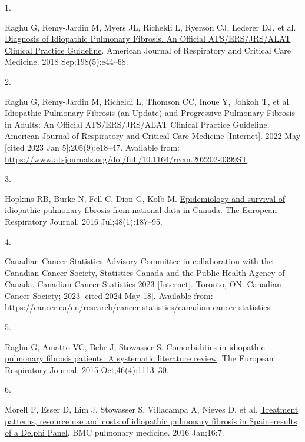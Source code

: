 \documentclass[
]{article}
\newlength{\cslhangindent}
\newlength{\csllabelwidth}
\newenvironment{CSLReferences}[2] %
 {\begin{list}{}{%
  \setlength{\itemindent}{0pt}
  \setlength{\leftmargin}{0pt}
  \setlength{\parsep}{0pt}
  \ifodd #1
   \setlength{\leftmargin}{\cslhangindent}
   \setlength{\itemindent}{-1\cslhangindent}
  \fi
  \setlength{\itemsep}{#2\baselineskip}}}
 {\end{list}}
\newcommand{\CSLLeftMargin}[1]{\parbox[t]{\csllabelwidth}{\strut#1\strut}}
\newcommand{\CSLRightInline}[1]{\parbox[t]{\linewidth - \csllabelwidth}{\strut#1\strut}}
\begin{document}
\label{refs}
\begin{CSLReferences}{0}{1}
\CSLLeftMargin{1. }%
\CSLRightInline{Raghu G, Remy-Jardin M, Myers JL, Richeldi L, Ryerson CJ, Lederer DJ, et al. \href{https://doi.org/10.1164/rccm.201807-1255ST}{Diagnosis of {Idiopathic} {Pulmonary} {Fibrosis}. {An} {Official} {ATS}/{ERS}/{JRS}/{ALAT} {Clinical} {Practice} {Guideline}}. American Journal of Respiratory and Critical Care Medicine. 2018 Sep;198(5):e44--68. }

\CSLLeftMargin{2. }%
\CSLRightInline{Raghu G, Remy-Jardin M, Richeldi L, Thomson CC, Inoue Y, Johkoh T, et al. Idiopathic {Pulmonary} {Fibrosis} (an {Update}) and {Progressive} {Pulmonary} {Fibrosis} in {Adults}: {An} {Official} {ATS}/{ERS}/{JRS}/{ALAT} {Clinical} {Practice} {Guideline}. American Journal of Respiratory and Critical Care Medicine {[}Internet{]}. 2022 May {[}cited 2023 Jan 5{]};205(9):e18--47. Available from: \url{https://www.atsjournals.org/doi/full/10.1164/rccm.202202-0399ST}}

\CSLLeftMargin{3. }%
\CSLRightInline{Hopkins RB, Burke N, Fell C, Dion G, Kolb M. \href{https://doi.org/10.1183/13993003.01504-2015}{Epidemiology and survival of idiopathic pulmonary fibrosis from national data in {Canada}}. The European Respiratory Journal. 2016 Jul;48(1):187--95. }

\CSLLeftMargin{4. }%
\CSLRightInline{Canadian Cancer Statistics Advisory Committee in collaboration with the Canadian Cancer Society, Statistics Canada and the Public Health Agency of Canada. Canadian {Cancer} {Statistics} 2023 {[}Internet{]}. Toronto, ON: Canadian Cancer Society; 2023 {[}cited 2024 May 18{]}. Available from: \url{https://cancer.ca/en/research/cancer-statistics/canadian-cancer-statistics}}

\CSLLeftMargin{5. }%
\CSLRightInline{Raghu G, Amatto VC, Behr J, Stowasser S. \href{https://doi.org/10.1183/13993003.02316-2014}{Comorbidities in idiopathic pulmonary fibrosis patients: A systematic literature review}. The European Respiratory Journal. 2015 Oct;46(4):1113--30. }

\CSLLeftMargin{6. }%
\CSLRightInline{Morell F, Esser D, Lim J, Stowasser S, Villacampa A, Nieves D, et al. \href{https://doi.org/10.1186/s12890-016-0168-6}{Treatment patterns, resource use and costs of idiopathic pulmonary fibrosis in {Spain}--results of a {Delphi} {Panel}}. BMC pulmonary medicine. 2016 Jan;16:7. }


\end{CSLReferences}
\end{document}
